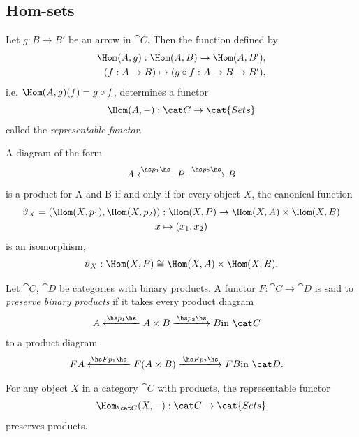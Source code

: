 \documentclass{article}
\begin{document}
\subsection{Hom-sets}

\begin{theorem}
    Let $g:B\to B'$ be an arrow in $\cat C$. Then the function
    defined by
    \begin{align*}
        \Hom(A, g):\Hom(A,B)\to\Hom(A,B'),\\
        (f:A\to B) \mapsto (g\circ f:A\to B\to B'),
    \end{align*}
    i.e. $\Hom(A,g)(f)=g\circ f$, determines a functor
    \begin{align*}
        \Hom(A,-):\cat C \to \cat{Sets}
    \end{align*}
    called the \emph{representable functor}.
\end{theorem}

\begin{proposition}
    A diagram of the form
    \begin{align*}
        A \xlongleftarrow{\hs p_1\hs} P \xlongrightarrow{\hs p_2\hs} B
    \end{align*}
    is a product for A and B if and only if for every object $X$, the canonical
    function
    \begin{gather*}
        \vartheta_X = (\Hom(X, p_1), \Hom(X, p_2)) : \Hom(X, P)\to \Hom(X,A)\times \Hom(X,B)\\
        x \mapsto (x_1, x_2)
    \end{gather*}
    is an isomorphism,
    \begin{align*}
        \vartheta_X:\Hom(X,P)\cong \Hom(X,A)\times\Hom(X,B).
    \end{align*}
\end{proposition}

\begin{definition}
    Let $\cat C$, $\cat D$ be categories with binary products. A functor
    $F:\cat C\to \cat D$ is said to \emph{preserve binary products} if it takes
    every product diagram
    \begin{align*}
        A \xlongleftarrow{\hs p_1\hs} A\times B \xlongrightarrow{\hs p_2\hs} B&\text{in }\cat C
    \end{align*}
    to a product diagram
    \begin{align*}
        FA\xlongleftarrow{\hs Fp_1\hs} F(A\times B)\xlongrightarrow{\hs Fp_2\hs}FB &\text{in }\cat D.
    \end{align*}
\end{definition}

\begin{corollary}
    For any object $X$ in a category $\cat C$ with products, the representable
    functor 
    \begin{align*}
        \Hom_{\cat C}(X, -) : \cat C \to \cat{Sets}
    \end{align*}
    preserves products.
\end{corollary}
\end{document}
